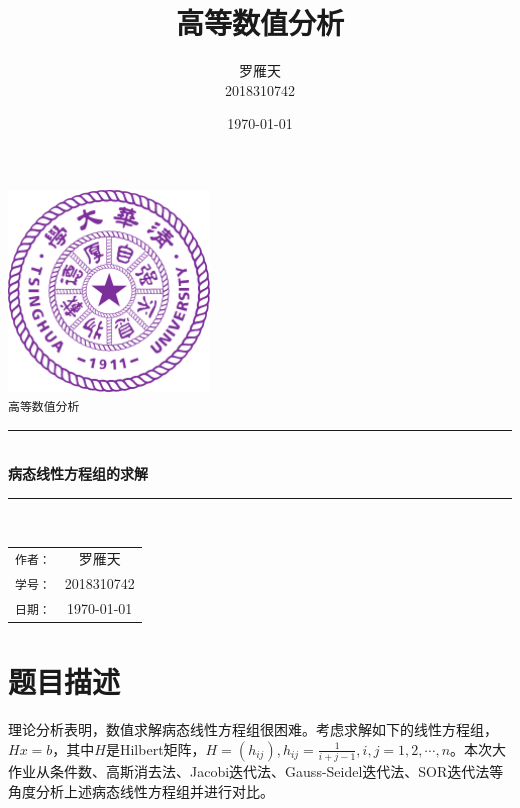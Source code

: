 \documentclass[a4paper]{article}
\title{高等数值分析}
\author{罗雁天 \\
2018310742}
\date{\today}
\begin{document}
\newcommand{\HRule}{\rule{\linewidth}{0.5mm}}
\begin{titlepage}
	\begin{center}
		\includegraphics[width=0.4\textwidth]{Tsinghua2.png}\\[1cm]
		\textsc{\Large \texttt{高等数值分析}}\\[1cm]
		\HRule \\[1cm]
		{\Huge \bfseries 病态线性方程组的求解}\\[0.4cm]
		\HRule \\[3.5cm]
		\begin{minipage}{0.4\textwidth}
			\begin{center}
				\Large
				\begin{tabular}{cc}
					\texttt{作者：} & 罗雁天 \\[0.5cm]
					\texttt{学号：} & 2018310742 \\[0.5cm]
					\texttt{日期：} & \today
				\end{tabular}
			\end{center}
		\end{minipage}
		\vfill
	\end{center}
\end{titlepage}

\tableofcontents
\newpage

\section{题目描述}
理论分析表明，数值求解病态线性方程组很困难。考虑求解如下的线性方程组，$Hx=b$，其中$H$是Hilbert矩阵，$H=(h_{ij}),h_{ij}=\frac{1}{i+j-1},i,j=1,2,\cdots,n$。本次大作业从条件数、高斯消去法、Jacobi迭代法、Gauss-Seidel迭代法、SOR迭代法等角度分析上述病态线性方程组并进行对比。
\end{document}
